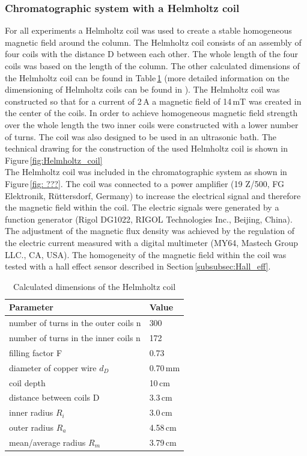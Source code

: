 \subsubsection{Chromatographic system with a Helmholtz coil}
\label{subsubsec:helm_coil}
For all experiments a Helmholtz coil was used to create a stable homogeneous magnetic field around the column. The Helmholtz coil consists of an assembly of four coils with the distance D between each other. The whole length of the four coils was based on the length of the column. The other calculated dimensions of the Helmholtz coil can be found in Table\,\ref{table:Helmholtz_coil} (more detailed information on the dimensioning of Helmholtz coils can be found in \cite{wotruba1968verbesserung,wotruba1969massive,heller1955erzeugung}). The Helmholtz coil was constructed so that for a current of 2\,A a magnetic field of 14\,mT was created in the center of the coils. In order to achieve homogeneous magnetic field strength over the whole length the two inner coils were constructed with a lower number of turns. The coil was also designed to be used in an ultrasonic bath. The technical drawing for the construction of the used Helmholtz coil is shown in Figure\,\ref{fig:Helmholtz_coil}\\  
The Helmholtz coil was included in the chromatographic system as shown in Figure\,\ref{fig: ???}. The coil was connected to a power amplifier (19 Z/500, FG Elektronik, Rüttersdorf, Germany) to increase the electrical signal and therefore the magnetic field within the coil. The electric signals were generated by a function generator (Rigol DG1022, RIGOL Technologies Inc., Beijing, China). The adjustment of the magnetic flux density was achieved by the regulation of the electric current measured with a digital multimeter (MY64, Mastech Group LLC., CA, USA). The homogeneity of the magnetic field within the coil was tested with a hall effect sensor described in Section\,\ref{subsubsec:Hall_eff}.    

\begin{table}[H]
\centering
\caption[Dimensions of the Helmholtz coil]{Calculated dimensions of the Helmholtz coil}
\label{table:Helmholtz_coil}
\begin{tabular}{ll}\hline
Parameter &  Value \\
\hline\hline
 number of turns in the outer coils n & 300 \\
 number of turns in the inner coils n & 172 \\
 filling factor F & 0.73\\
 diameter of copper wire $d_{D}$ & 0.70\,mm\\
 coil depth & 10\,cm\\
 distance between coils D & 3.3\,cm \\
 inner radius $R_{i}$ & 3.0\,cm\\ 
 outer radius $R_{a}$ & 4.58\,cm\\
 mean/average radius $R_{m}$ & 3.79\,cm\\
 \hline
\end{tabular}
\end{table}


